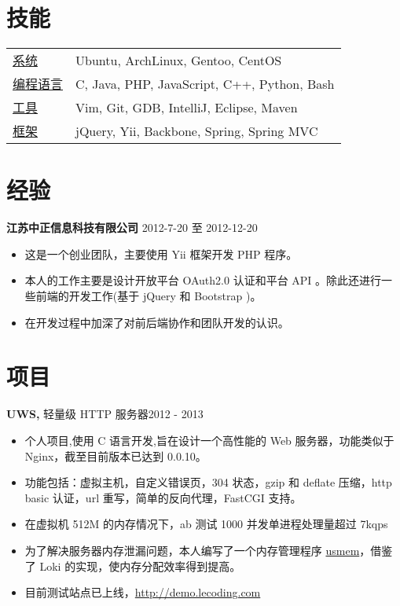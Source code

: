 \documentclass[margin]{res}
\begin{document}
 

\address{ 张启超 \\ }
\address{ 南京大学软件学院 2010级 本科 \\ (+86) 152-9838-8316  \\ \href{http://lecoding.com}{http://lecoding.com} \\ 
\href{mailto:njuzhangqichao@gmail.com}{njuzhangqichao@gmail.com} }

 
\begin{resume} 
 
\section{技能} 
   \begin{tabular}{l p{3in}}
      \underline{系统} &  Ubuntu, ArchLinux, Gentoo, CentOS \\
      \underline{编程语言} &  C, Java, PHP, JavaScript, C++, Python, Bash \\
      \underline{工具} & Vim, Git, GDB, IntelliJ, Eclipse, Maven \\
      \underline{框架} & jQuery, Yii, Backbone, Spring, Spring MVC
 \end{tabular}

\section{经验} 
{\bf 江苏中正信息科技有限公司} \hfill 2012-7-20 至 2012-12-20 
\begin{itemize} \itemsep -2pt 
\item 这是一个创业团队，主要使用 Yii 框架开发 PHP 程序。
\item 本人的工作主要是设计开放平台 OAuth2.0 认证和平台 API 。除此还进行一些前端的开发工作(基于 jQuery 和 Bootstrap )。
\item 在开发过程中加深了对前后端协作和团队开发的认识。
\end{itemize}

\section{项目}
 {\bf UWS,} 轻量级 HTTP 服务器\hfill 2012 - 2013
 \begin{itemize} \itemsep -2pt

\item 个人项目,使用 C 语言开发,旨在设计一个高性能的 Web 服务器，功能类似于 Nginx，截至目前版本已达到 0.0.10。
\item 功能包括：虚拟主机，自定义错误页，304 状态，gzip 和 deflate 压缩，http basic 认证，url 重写，简单的反向代理，FastCGI 支持。
\item 在虚拟机 512M 的内存情况下，ab 测试 1000 并发单进程处理量超过 7kqps
\item 为了解决服务器内存泄漏问题，本人编写了一个内存管理程序 \href{https://github.com/usbuild/usmem}{usmem}，借鉴了 Loki 的实现，使内存分配效率得到提高。
\item 目前测试站点已上线，\href{http://demo.lecoding.com}{http://demo.lecoding.com}
\end{itemize}


\end{resume}
\end{document}
